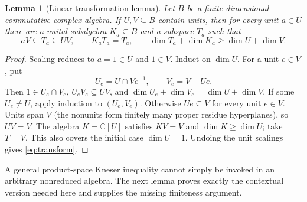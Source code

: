 \documentclass[11pt]{article}
\newtheorem{lemma}[theorem]{Lemma}
\theoremstyle{definition}
\theoremstyle{remark}
\newcommand{\C}{\mathbb C}
\begin{document}
\begin{lemma}[Linear transformation lemma]\label{lem:transform}
Let $B$ be a finite-dimensional commutative complex algebra. If $U,V\subseteq B$
contain units, then for every unit $a\in U$ there are a unital subalgebra
$K_a\subseteq B$ and a subspace $T_a$ such that
\begin{equation}\label{eq:transform}
 aV\subseteq T_a\subseteq UV,\qquad K_aT_a=T_a,\qquad
 \dim T_a+\dim K_a\ge\dim U+\dim V.
\end{equation}
\end{lemma}
\begin{proof}
Scaling reduces to $a=1\in U$ and $1\in V$. Induct on $\dim U$.
For a unit $e\in V$, put
\[
 U_e=U\cap Ve^{-1},\qquad V_e=V+Ue.
\]
Then $1\in U_e\cap V_e$, $U_eV_e\subseteq UV$, and
$\dim U_e+\dim V_e=\dim U+\dim V$.
If some $U_e\ne U$, apply induction to $(U_e,V_e)$.
Otherwise $Ue\subseteq V$ for every unit $e\in V$.
Units span $V$ (the nonunits form finitely many proper residue hyperplanes),
so $UV=V$. The algebra $K=\C[U]$ satisfies $KV=V$ and $\dim K\ge\dim U$;
take $T=V$. This also covers the initial case $\dim U=1$.
Undoing the unit scalings gives \eqref{eq:transform}.
\end{proof}

A general product-space Kneser inequality cannot simply be invoked in an
arbitrary nonreduced algebra. The next lemma proves exactly the contextual
version needed here and supplies the missing finiteness argument.
\end{document}
